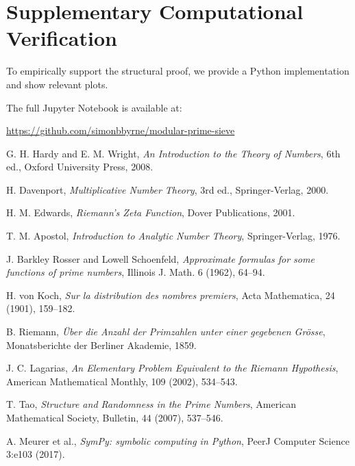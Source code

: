 \documentclass[11pt]{article}
\begin{document}
	
	
	\section*{Supplementary Computational Verification}
	
	To empirically support the structural proof, we provide a Python implementation and show relevant plots. 
	
	
	The full Jupyter Notebook is available at:
	
	\url{https://github.com/simonbbyrne/modular-prime-sieve}
	
	
	\begin{thebibliography}{99}
		
		G. H. Hardy and E. M. Wright, \textit{An Introduction to the Theory of Numbers}, 6th ed., Oxford University Press, 2008.
		
		H. Davenport, \textit{Multiplicative Number Theory}, 3rd ed., Springer-Verlag, 2000.
		
		H. M. Edwards, \textit{Riemann's Zeta Function}, Dover Publications, 2001.
		
		T. M. Apostol, \textit{Introduction to Analytic Number Theory}, Springer-Verlag, 1976.
		
		J. Barkley Rosser and Lowell Schoenfeld, \textit{Approximate formulas for some functions of prime numbers}, Illinois J. Math. 6 (1962), 64–94.
		
		H. von Koch, \textit{Sur la distribution des nombres premiers}, Acta Mathematica, 24 (1901), 159–182.
		
		B. Riemann, \textit{Über die Anzahl der Primzahlen unter einer gegebenen Grösse}, Monatsberichte der Berliner Akademie, 1859.
		
		J. C. Lagarias, \textit{An Elementary Problem Equivalent to the Riemann Hypothesis}, American Mathematical Monthly, 109 (2002), 534–543.
		
		T. Tao, \textit{Structure and Randomness in the Prime Numbers}, American Mathematical Society, Bulletin, 44 (2007), 537–546.
		
		A. Meurer et al., \textit{SymPy: symbolic computing in Python}, PeerJ Computer Science 3:e103 (2017).
		
	\end{thebibliography}

	
	
	
	
	
\end{document}
